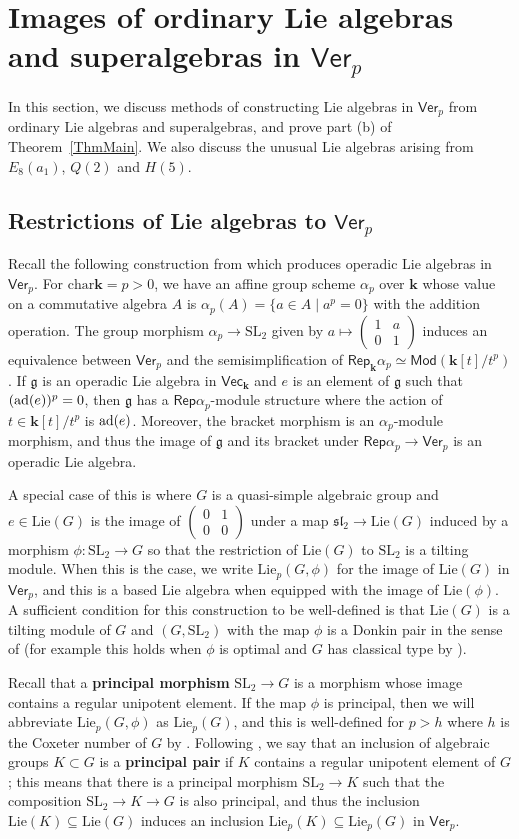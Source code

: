 \documentclass[11pt,a4paper,reqno]{amsart}
\theoremstyle{definition}
\newcommand{\bk}{\mathbf{k}}
\numberwithin{equation}{section}
\newcommand{\charr}{\mathrm{char}}
\newcommand{\Ver}{\mathsf{Ver}}
\newcommand{\Mod}{\mathsf{Mod}}
\newcommand{\Rep}{\mathsf{Rep}}
\newcommand{\fg}{\mathfrak{g}}
\newcommand{\fsl}{\mathfrak{sl}}
\newcommand{\Lie}{\mathrm{Lie}}
\newcommand{\Vecc}{\mathsf{Vec}}
\newcommand{\SL}{\mathrm{SL}}
\newcommand{\sM}[1]{\left(\begin{smallmatrix}#1\end{smallmatrix}\right)}
\begin{document}
\section{Images of ordinary Lie algebras and superalgebras in $\Ver_p$}\label{SecImages}

In this section, we discuss methods of constructing Lie algebras in $\Ver_p$ from ordinary Lie algebras and superalgebras, and prove part (b) of Theorem~\ref{ThmMain}. We also discuss the unusual Lie algebras arising from $E_8(a_1)$, $Q(2)$ and $H(5)$.

\subsection{Restrictions of Lie algebras to $\Ver_p$}\label{SecOrdinary} Recall the following construction from \cite[\S3.2]{Ka} which produces operadic Lie algebras in $\Ver_p$. For $\charr\bk=p>0$, we have an affine group scheme $\alpha_p$ over $\bk$ whose value on a commutative algebra $A$ is $\alpha_p(A)=\{a\in A\mid a^p=0\}$ with the addition operation. The group morphism $\alpha_p\to\SL_2$ given by $a\mapsto\sM{1&a\\0&1}$ induces an equivalence between $\Ver_p$ and the semisimplification of $\Rep_{\bk}\alpha_p\simeq\Mod(\bk[t]/t^p)$. If $\fg$ is an operadic Lie algebra in $\Vecc_\bk$ and $e$ is an element of $\fg$ such that $({\rm ad}(e))^p=0$, then $\fg$ has a $\Rep\alpha_p$-module structure where the action of $t\in\bk[t]/t^p$ is ${\rm ad}(e)$. Moreover, the bracket morphism is an $\alpha_p$-module morphism, and thus the image of $\fg$ and its bracket under $\Rep\alpha_p\to\Ver_p$ is an operadic Lie algebra.

A special case of this is where $G$ is a quasi-simple algebraic group and $e\in\Lie(G)$ is the image of $\sM{0&1\\0&0}$ under a map $\fsl_2\to\Lie(G)$ induced by a morphism $\phi:\SL_2\to G$ so that the restriction of $\Lie(G)$ to $\SL_2$ is a tilting module. When this is the case, we write $\Lie_p(G,\phi)$ for the image of $\Lie(G)$ in $\Ver_p$, and this is a based Lie algebra when equipped with the image of $\Lie(\phi)$. A sufficient condition for this construction to be well-defined is that $\Lie(G)$ is a tilting module of $G$ and $(G,\SL_2)$ with the map $\phi$ is a Donkin pair in the sense of \cite{HM} (for example this holds when $\phi$ is optimal and $G$ has classical type by \cite[Theorem~4.1.2]{HM}). 

Recall that a \textbf{principal morphism} $\SL_2\to G$ is a morphism whose image contains a regular unipotent element. If the map $\phi$ is principal, then we will abbreviate $\Lie_p(G,\phi)$ as $\Lie_p(G)$, and this is well-defined for $p>h$ where $h$ is the Coxeter number of $G$ by \cite[Lemma~3.2.2]{CEN}. Following \cite{EO}, we say that an inclusion of algebraic groups $K\subset G$ is a \textbf{principal pair} if $K$ contains a regular unipotent element of $G$; this means that there is a principal morphism $\SL_2\to K$ such that the composition $\SL_2\to K\to G$ is also principal, and thus the inclusion $\Lie(K)\subseteq\Lie(G)$ induces an inclusion $\Lie_p(K)\subseteq\Lie_p(G)$ in $\Ver_p$.
\end{document}
